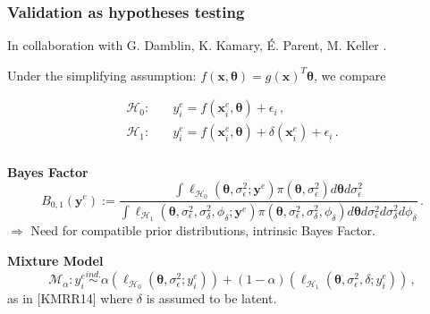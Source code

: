 \documentclass[nopagenumber,9pt]{beamer}
\newcommand{\btheta}{\boldsymbol{\theta}}
\newcommand{\by}{\mathbf{y}}
\newcommand{\bx}{\mathbf{x}}
\newcommand{\bxf}{\bx^e}
\newcommand{\yf}{y^e}
\newcommand{\byf}{\by^e}
\newcommand{\citemano}[1]{\textcolor{dgreen}{#1}}
\begin{document}
\begin{frame}
 \frametitle{Validation as hypotheses testing}

 In collaboration with G. Damblin, K. Kamary, É. Parent, M. Keller \cite{damblin2016bayesian,kaniav}.

 \bigskip


  Under the simplifying assumption: $f(\bx,\btheta)=g(\bx)^T \btheta$, we compare

 \begin{align*}
 \mathcal{H}_0:\quad & \yf_i = f(\bxf_i,{\btheta}) + \epsilon_i\,,\\
 \mathcal{H}_1:\quad & \yf_i = f(\bxf_i,{\btheta}) + \delta(\bxf_i) + \epsilon_i\,.\\
\end{align*}
%

 \textbf{Bayes Factor}
 $$B_{0,1}(\byf):=\frac
{\int \ell_{\mathcal H_0}(\btheta ,\sigma_\epsilon^2;\byf )\pi(\btheta ,\sigma_\epsilon^2)d \btheta d\sigma_\epsilon^2}
{\int \ell_{\mathcal H_1}(\btheta ,\sigma_\epsilon^2,\sigma_\delta^2,\phi_\delta;\byf )\pi(\btheta ,\sigma_\epsilon^2,\sigma_\delta^2,\phi_\delta)d \btheta d\sigma_\epsilon^2d\sigma_\delta^2d\phi_\delta}\,.$$
$\Rightarrow$ Need for compatible prior distributions, intrinsic Bayes Factor.


\bigskip


\textbf{Mixture Model}
 \begin{equation*}\label{eq:mixture}
\mathcal M_\alpha: \yf_i\overset{ind.}{\sim} \alpha \left(\ell_{\mathcal H_0}(\btheta, \sigma_\epsilon^2;\yf_i)\right)+(1-\alpha)\left(\ell_{\mathcal H_1}(\btheta, \sigma_\epsilon^2, \delta;\yf_i)\right)\,,
\end{equation*}
 as in \citemano{[KMRR14]} where $\delta$ is assumed to be latent.

\end{frame}
\end{document}
